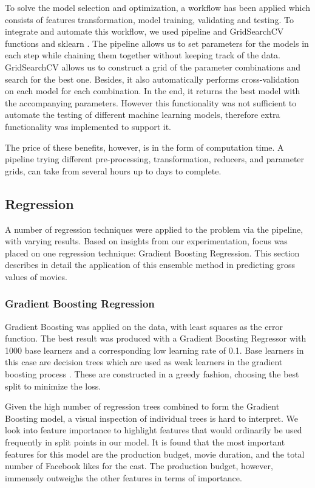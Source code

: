 To solve the model selection and optimization, a  workflow has been applied which consists of features transformation, model training, validating and testing. To integrate and automate this workflow, we used  pipeline and GridSearchCV functions and sklearn \cite{sklearnpipeline}. The pipeline allows us to set parameters for the models in each step while chaining them together without keeping track of the data. GridSearchCV allows us to construct a grid of the parameter combinations and search for the best one. Besides, it also automatically performs cross-validation on each model for each combination. In the end, it returns the best model with the accompanying parameters. However this functionality was not sufficient to automate the testing of different machine learning models, therefore extra functionality was implemented to support it.

The price of these benefits, however, is in the form of computation time. A pipeline trying different pre-processing, transformation, reducers, and parameter grids,  can take from several hours up to days to complete. 
\subsection{Regression}

A number of regression techniques were applied to the problem via the pipeline, with varying results. Based on insights from our experimentation, focus was placed on one regression technique: Gradient Boosting Regression. This section describes in detail the application of this ensemble method in predicting gross values of movies. 

\subsubsection{Gradient Boosting Regression}
Gradient Boosting was applied on the data, with least squares as the error function. The best result was produced with a Gradient Boosting Regressor with 1000 base learners and a corresponding low learning rate of 0.1. Base learners in this case are decision trees which are used as weak learners in the gradient boosting process \cite{natekin2013gradient}. These are constructed in a greedy fashion, choosing the best split to minimize the loss. 

Given the high number of regression trees combined to form the Gradient Boosting model, a visual inspection of individual trees is hard to interpret. We look into feature importance to highlight features that would ordinarily be used frequently in split points in our model. It is found that the most important features for this model are the production budget, movie duration, and the total number of Facebook likes for the cast. The production budget, however, immensely outweighs the other features in terms of importance. 

